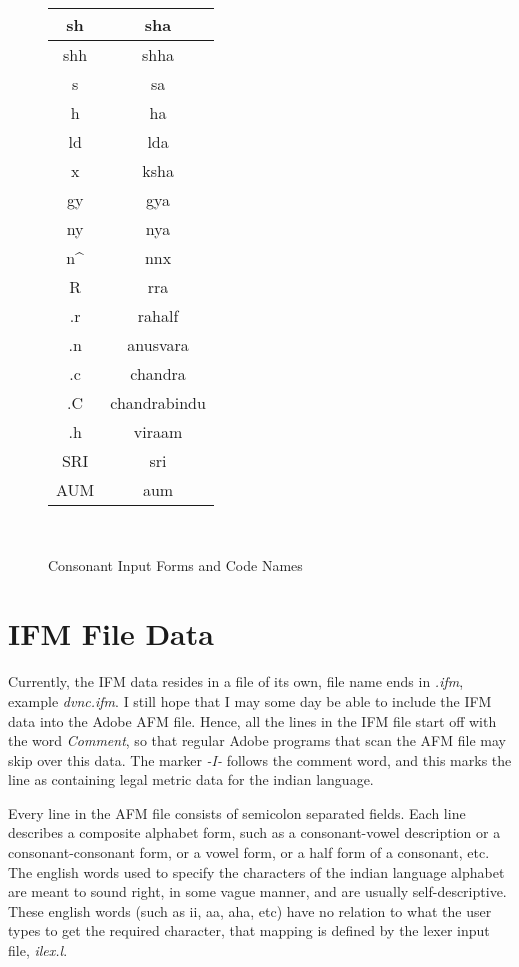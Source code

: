 \documentclass[11pt]{article}
\begin{document}
\begin{figure}
\begin{center}
\begin{tabular}{|c|c|}
sh	& sha	\\ \hline
shh	& shha	\\ \hline
s	& sa	\\ \hline
h	& ha	\\ \hline
ld	& lda	\\ \hline
x	& ksha	\\ \hline
gy	& gya	\\ \hline
ny	& nya	\\ \hline
n\^	& nnx	\\ \hline
R	& rra	\\ \hline
.r	& rahalf	\\ \hline
.n	& anusvara	\\ \hline
.c	& chandra	\\ \hline
.C	& chandrabindu	\\ \hline
.h	& viraam	\\ \hline
SRI	& sri	\\ \hline
AUM	& aum	\\ \hline
\end{tabular}
\\
\end{center}
\caption {Consonant Input Forms and Code Names}
\end{figure}

\section{IFM File Data}

Currently, the IFM data resides in a file of its own, file name ends in 
{\em .ifm}, example {\em dvnc.ifm}.
I still hope
that I may some day be able to include the IFM data into the Adobe AFM file.
Hence, all the lines in the IFM file start off with the word {\em
Comment\/}, so that regular Adobe programs that scan the AFM file may
skip over this data.
The marker {\em -I-} follows the comment word, and this marks the line as
containing legal metric data for the indian language.

Every line in the AFM file consists of semicolon separated fields.
Each line describes a composite alphabet form, such as a consonant-vowel
description or a consonant-consonant form, or a vowel form, or a half
form of a consonant, etc.
The english words used to specify the characters of the indian language
alphabet are meant to sound right, in some vague manner, and are usually
self-descriptive.
These english words (such as ii, aa, aha, etc) have no relation to what
the user types to get the required character, that mapping is defined by
the lexer input file, {\em ilex.l}.
\end{document}
